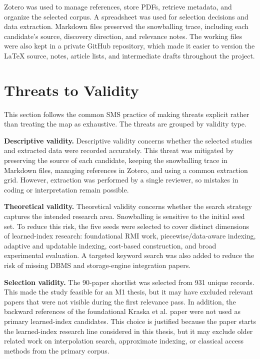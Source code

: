 \documentclass[a4paper, 12pt, twoside]{report}
\begin{document}
Zotero was used to manage references, store PDFs, retrieve metadata, and organize the selected corpus. A spreadsheet was used for selection decisions and data extraction. Markdown files preserved the snowballing trace, including each candidate's source, discovery direction, and relevance notes. The working files were also kept in a private GitHub repository, which made it easier to version the LaTeX source, notes, article lists, and intermediate drafts throughout the project.

\section{Threats to Validity}

This section follows the common SMS practice of making threats explicit rather than treating the map as exhaustive. The threats are grouped by validity type.

\textbf{Descriptive validity.} Descriptive validity concerns whether the selected studies and extracted data were recorded accurately. This threat was mitigated by preserving the source of each candidate, keeping the snowballing trace in Markdown files, managing references in Zotero, and using a common extraction grid. However, extraction was performed by a single reviewer, so mistakes in coding or interpretation remain possible.

\textbf{Theoretical validity.} Theoretical validity concerns whether the search strategy captures the intended research area. Snowballing is sensitive to the initial seed set. To reduce this risk, the five seeds were selected to cover distinct dimensions of learned-index research: foundational RMI work, piecewise/data-aware indexing, adaptive and updatable indexing, cost-based construction, and broad experimental evaluation. A targeted keyword search was also added to reduce the risk of missing DBMS and storage-engine integration papers.

\textbf{Selection validity.} The 90-paper shortlist was selected from 931 unique records. This made the study feasible for an M1 thesis, but it may have excluded relevant papers that were not visible during the first relevance pass. In addition, the backward references of the foundational Kraska et al. paper were not used as primary learned-index candidates. This choice is justified because the paper starts the learned-index research line considered in this thesis, but it may exclude older related work on interpolation search, approximate indexing, or classical access methods from the primary corpus.
\end{document}
